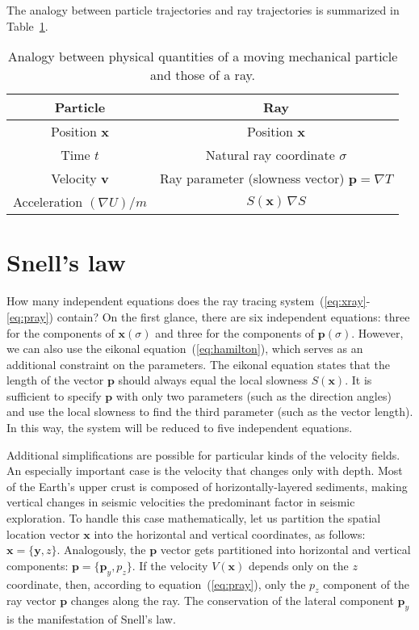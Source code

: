\documentclass[12pt]{handout}
\begin{document}
The analogy between particle trajectories and ray trajectories is
summarized in Table~\ref{tab:anal}. 

\begin{table}
  \centering
  \begin{tabular}{|c||c|} \hline
    Particle & Ray \\ \hline \hline
    Position $\mathbf{x}$ & Position $\mathbf{x}$ \\ \hline
    Time $t$ & Natural ray coordinate $\sigma$ \\ \hline
    Velocity $\mathbf{v}$ & Ray parameter (slowness vector) $\mathbf{p} = \nabla T$  \\ \hline
    Acceleration 
    $(\nabla U)/m$ & $S(\mathbf{x})\,\nabla S$ \\ \hline
  \end{tabular}
\caption{Analogy between physical quantities of a moving mechanical
  particle and those of a ray.}
\label{tab:anal}
\end{table}

\section{Snell's law}
How many independent equations does the ray tracing
system~(\ref{eq:xray}-\ref{eq:pray}) contain? On the first glance,
there are six independent equations: three for the components of
$\mathbf{x}(\sigma)$ and three for the components of
$\mathbf{p}(\sigma)$. However, we can also use the eikonal
equation~(\ref{eq:hamilton}), which serves as an additional constraint
on the parameters. The eikonal equation states that the length of the
vector $\mathbf{p}$ should always equal the local slowness
$S(\mathbf{x})$. It is sufficient to specify $\mathbf{p}$ with only
two parameters (such as the direction angles) and use the local
slowness to find the third parameter (such as the vector length). In
this way, the system will be reduced to five independent equations.

Additional simplifications are possible for particular kinds of the
velocity fields. An especially important case is the velocity that
changes only with depth. Most of the Earth's upper crust is composed
of horizontally-layered sediments, making vertical changes in seismic
velocities the predominant factor in seismic exploration. To handle
this case mathematically, let us partition the spatial location vector
$\mathbf{x}$ into the horizontal and vertical coordinates, as follows:
$\mathbf{x}=\{\mathbf{y},z\}$. Analogously, the $\mathbf{p}$ vector
gets partitioned into horizontal and vertical components: 
$\mathbf{p}=\{\mathbf{p}_y,p_z\}$. If the velocity $V(\mathbf{x})$
depends only on the $z$ coordinate, then, according to
equation~(\ref{eq:pray}), only the $p_z$ component of the ray vector
$\mathbf{p}$ changes along the ray. The conservation of the lateral
component $\mathbf{p}_y$ is the manifestation of Snell's law.
\end{document}
